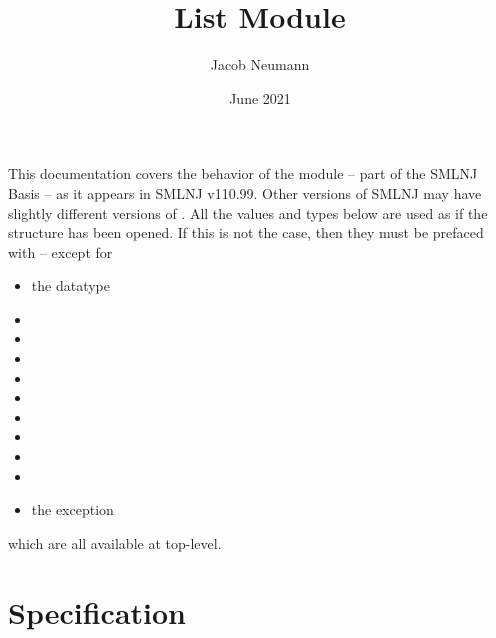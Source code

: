 \documentclass[12pt]{article}
\title{List Module}
\date{June 2021}
\author{Jacob Neumann}
\begin{document}

\vspace{-12pt}
\tableofcontents

This documentation covers the behavior of the  module -- part of the SMLNJ Basis -- as it appears in SMLNJ v110.99. Other versions of SMLNJ may have slightly different versions of . All the values and types below are used as if the  structure has been opened. If this is not the case, then they must be prefaced with  -- except for
\begin{itemize}
    \item the datatype 
    \item {}
    \item {}
    \item {}
    \item {}
    \item {}
    \item {}
    \item {}
    \item {}
    \item {}
    \item the exception 
\end{itemize}
which are all available at top-level.

\section{Specification}
\end{document}
